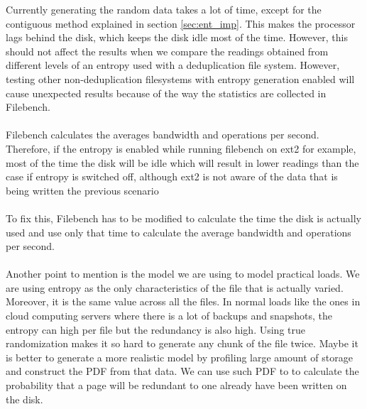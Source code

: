 Currently generating the random data takes a lot of time, except for the contiguous method explained in section \ref{sec:ent_imp}.
This makes the processor lags behind the disk, which keeps the disk idle most of the time.
 However, this should not affect the results when we compare the readings obtained from different levels of an entropy used with a deduplication file system.
 However, testing other non-deduplication filesystems with entropy generation enabled will cause unexpected results because of the way the statistics are collected in Filebench.
\paragraph{}
 Filebench calculates the averages bandwidth and operations per second.
 Therefore, if the entropy is enabled while running filebench on ext2 for example, most of the time the disk will be idle which will result in lower readings than the case if entropy is switched off, although ext2 is not aware of the data that is being written the previous scenario 
\paragraph{}
To fix this, Filebench has to be modified to calculate the time the disk is actually used and use only that time to calculate the average bandwidth and operations per second.
\paragraph{}
Another point to mention is the model we are using to model practical loads. We are using entropy as the only characteristics of the file that is actually varied.
 Moreover, it is the same value across all the files. In normal loads like the ones in cloud computing servers where there is a lot of backups and snapshots, the entropy can high per file but the redundancy is also high.
 Using true randomization makes it so hard to generate any chunk of the file twice.
 Maybe it is better to generate a more realistic model by profiling large amount of storage and construct the PDF from that data. We can use such PDF to to calculate the probability that a page will be redundant to one already have been written on the disk.
